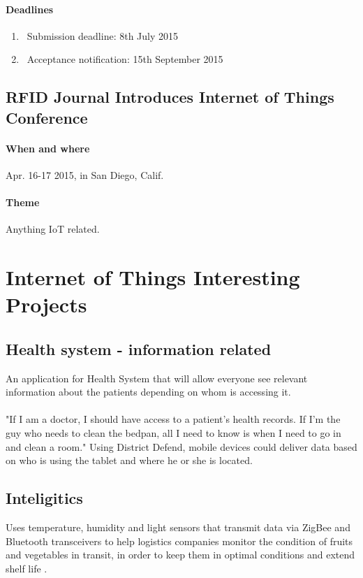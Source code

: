 \documentclass[12pt]{article}
\begin{document}
\paragraph {Deadlines}
\begin{enumerate}
\item\ Submission deadline: 8th July 2015
\item\ Acceptance notification: 15th September 2015

\end{enumerate}

\subsection {RFID Journal Introduces Internet of Things Conference}
\paragraph {When and where} Apr. 16-17 2015, in San Diego, Calif.
\paragraph {Theme} Anything IoT related.

\section{Internet of Things Interesting Projects}

\subsection{Health system - information related} An application for Health System that will allow everyone see relevant information about the patients depending on whom is accessing it.
\paragraph {} "If I am a doctor, I should have access to a patient's health records. If I'm the guy who needs to clean the bedpan, all I need to know is when I need to go in and clean a room." Using District Defend, mobile devices could deliver data based on who is using the tablet and where he or she is located.

 \subsection{Inteligitics} Uses temperature, humidity and light sensors that transmit data via ZigBee and Bluetooth transceivers to help logistics companies monitor the condition of fruits and vegetables in transit, in order to keep them in optimal conditions and extend shelf life \cite {notes}.
\end{document}
